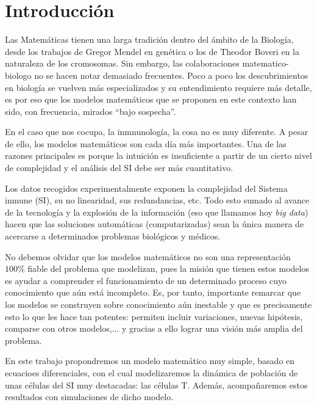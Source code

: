 \chapter{Introducción}
\label{cap:introduccion}


Las Matemáticas tienen una larga tradición dentro del ámbito de la Biología, desde los trabajos de Gregor Mendel en genética o los de Theodor Boveri en la naturaleza de los cromosomas. Sin embargo, las colaboraciones matematico-biologo no se hacen notar demasiado frecuentes. Poco a poco los descubrimientos en biología se vuelven más especializados y su entendimiento requiere más detalle, es por eso que los modelos matemáticos que se proponen en este contexto han sido, con frecuencia, mirados ``bajo sospecha''. 

En el caso que nos cocupa, la inmnunología, la cosa no es muy diferente. A pesar de ello, los modelos matemáticos son cada día más importantes. Una de las razones principales es porque la intuición es insuficiente a partir de un cierto nivel de complejidad y el análisis del SI debe ser más cuantitativo. 

Los datos recogidos experimentalmente exponen la complejidad del Sistema inmune (SI), su no linearidad, sus redundancias, etc. Todo esto sumado al avance de la tecnología y la explosión de la información (eso que llamamos hoy \textit{big data}) hacen que las soluciones automáticas (computarizadas) sean la única manera de acercarse a determinados problemas biológicos y médicos. 

No debemos olvidar que los modelos matemáticos no son una representación $100\%$ fiable del problema que modelizan, pues la misión que tienen estos modelos es ayudar a comprender el funcionamiento de un determinado proceso cuyo conocimiento que aún está incompleto. Es, por tanto, importante remarcar que los modelos se construyen sobre conocimiento aún inestable y que es precisamente esto lo que les hace tan potentes: permiten incluir variaciones, nuevas hipótesis, comparse con otros modelos,... y gracias a ello lograr una visión más amplia del problema. 

En este trabajo propondremos un modelo matemático muy simple, basado en ecuacioes diferenciales, con el cual modelizaremos la dinámica de población de unas células del SI muy destacadas: las células T. Además, acompañaremos estos resultados con simulaciones de dicho modelo. 


